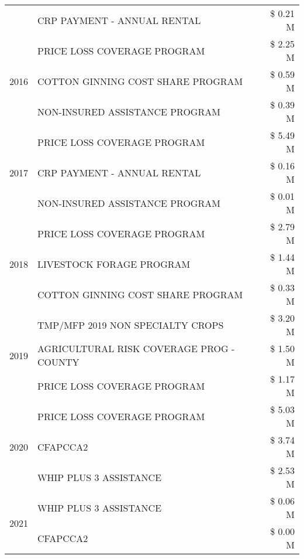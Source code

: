 \begin{tabular}{llr}
 & CRP PAYMENT - ANNUAL RENTAL & \$ 0.21 M \\
\cline{1-3}
\multirow[t]{3}{*}{2016} & PRICE LOSS COVERAGE PROGRAM & \$ 2.25 M \\
 & COTTON GINNING COST SHARE PROGRAM & \$ 0.59 M \\
 & NON-INSURED ASSISTANCE PROGRAM & \$ 0.39 M \\
\cline{1-3}
\multirow[t]{3}{*}{2017} & PRICE LOSS COVERAGE PROGRAM & \$ 5.49 M \\
 & CRP PAYMENT - ANNUAL RENTAL & \$ 0.16 M \\
 & NON-INSURED ASSISTANCE PROGRAM & \$ 0.01 M \\
\cline{1-3}
\multirow[t]{3}{*}{2018} & PRICE LOSS COVERAGE PROGRAM & \$ 2.79 M \\
 & LIVESTOCK FORAGE PROGRAM & \$ 1.44 M \\
 & COTTON GINNING COST SHARE PROGRAM & \$ 0.33 M \\
\cline{1-3}
\multirow[t]{3}{*}{2019} & TMP/MFP 2019 NON SPECIALTY CROPS & \$ 3.20 M \\
 & AGRICULTURAL RISK COVERAGE PROG - COUNTY & \$ 1.50 M \\
 & PRICE LOSS COVERAGE PROGRAM & \$ 1.17 M \\
\cline{1-3}
\multirow[t]{3}{*}{2020} & PRICE LOSS COVERAGE PROGRAM & \$ 5.03 M \\
 & CFAPCCA2 & \$ 3.74 M \\
 & WHIP PLUS 3 ASSISTANCE & \$ 2.53 M \\
\cline{1-3}
\multirow[t]{2}{*}{2021} & WHIP PLUS 3 ASSISTANCE & \$ 0.06 M \\
 & CFAPCCA2 & \$ 0.00 M \\
\cline{1-3}
\bottomrule
\end{tabular}
